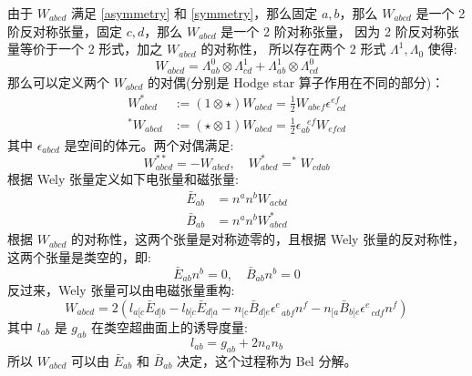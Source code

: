\documentclass[lang=cn,a4paper,newtx]{elegantpaper}
\begin{document}
由于 $W_{abcd}$ 满足 \eqref{asymmetry} 和 \eqref{symmetry}，那么固定 $a, b$，那么 $W_{abcd}$ 是一个
2阶反对称张量，固定 $c, d$，那么 $W_{abcd}$ 是一个 2 阶对称张量，
因为 2 阶反对称张量等价于一个 2 形式，加之 $W_{abcd}$ 的对称性，
所以存在两个 2 形式 $\Lambda^1, \Lambda_0$ 使得:
$$
W_{abcd} = \Lambda^0_{ab}\otimes\Lambda^1_{cd} +
\Lambda^1_{ab}\otimes\Lambda^0_{cd}
$$
那么可以定义两个 $W_{abcd}$ 的对偶(分别是 Hodge star 算子作用在不同的部分)：
$$
\begin{aligned}
    W_{abcd}^* & := (1\otimes\star)W_{abcd} 
    = \frac{1}{2}W_{abef}\epsilon^{ef}_{\ \ \ cd}\\
    ^*W_{abcd} & := (\star\otimes 1)W_{abcd}
    = \frac{1}{2}\epsilon^{\ \ \ ef}_{ab}W_{efcd}
\end{aligned}
$$
其中 $\epsilon_{abcd}$ 是空间的体元。两个对偶满足:
$$
W_{abcd}^{**} = -W_{abcd}, \quad W_{abcd}^* = ^*W_{cdab}
$$
根据 Wely 张量定义如下电张量和磁张量:
$$
\begin{aligned}
    \bar{E}_{ab} & = n^an^bW_{acbd}\\
    \bar{B}_{ab} & = n^an^bW_{abcd}^*
\end{aligned}
$$
根据 $W_{abcd}$ 的对称性，这两个张量是对称迹零的，且根据 Wely 张量的反对称性，
这两个张量是类空的，即:
$$
\bar{E}_{ab} n^b = 0, \quad \bar{B}_{ab}n^b = 0
$$
反过来，Wely
张量可以由电磁张量重构:
$$
W_{abcd} = 2(l_{a[c}\bar{E}_{d]b} - l_{b[c}\bar{E}_{d]a} - 
n_{[c}\bar{B}_{d]e}\epsilon^{e}_{\ \ \ abf}n^f - 
n_{[a}\bar{B}_{b]e}\epsilon^{e}_{\ \ \ cdf}n^f)
$$
其中 $l_{ab}$ 是 $g_{ab}$ 在类空超曲面上的诱导度量:
$$
l_{ab} = g_{ab} + 2n_an_b
$$
所以 $W_{abcd}$ 可以由 $\bar{E}_{ab}$ 和 $\bar{B}_{ab}$ 决定，这个过程称为 Bel
分解。
\end{document}
